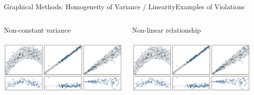 \documentclass{beamer}
\begin{document}
\begin{frame}{Graphical Methods: Homogeneity of Variance / Linearity}{Examples of Violations}
\begin{columns}
\pause\begin{column}{.5\textwidth}
\begin{center}
Non-constant variance\\~\\

\includegraphics[width=.9\textwidth]{plots/heteroscedastic.pdf}
\end{center}
\end{column}
\pause\begin{column}{.5\textwidth}
\begin{center}
Non-linear relationship\\~\\

\includegraphics[width=.9\textwidth]{plots/nonlinear.pdf}
\end{center}
\end{column}
\end{columns}
\end{frame}
\end{document}
